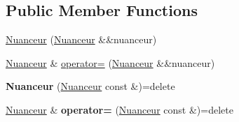\subsection*{Public Member Functions}
\begin{DoxyCompactItemize}
\item 
\hyperlink{classopengl_1_1_nuanceur_a47a89b5dbdf854997139082031f2a3b3}{Nuanceur} (\hyperlink{classopengl_1_1_nuanceur}{Nuanceur} \&\&nuanceur)
\item 
\hyperlink{classopengl_1_1_nuanceur}{Nuanceur} \& \hyperlink{classopengl_1_1_nuanceur_a1e82b8585d2e08f18ba4e030c43d46f7}{operator=} (\hyperlink{classopengl_1_1_nuanceur}{Nuanceur} \&\&nuanceur)
\item 
\hypertarget{classopengl_1_1_nuanceur_aac445c30d61ff2c71550e070f9a51cba}{}{\bfseries Nuanceur} (\hyperlink{classopengl_1_1_nuanceur}{Nuanceur} const \&)=delete\label{classopengl_1_1_nuanceur_aac445c30d61ff2c71550e070f9a51cba}

\item 
\hypertarget{classopengl_1_1_nuanceur_aa68174578a648b9bc4ae6115bff5606d}{}\hyperlink{classopengl_1_1_nuanceur}{Nuanceur} \& {\bfseries operator=} (\hyperlink{classopengl_1_1_nuanceur}{Nuanceur} const \&)=delete\label{classopengl_1_1_nuanceur_aa68174578a648b9bc4ae6115bff5606d}


\end{DoxyCompactItemize}
